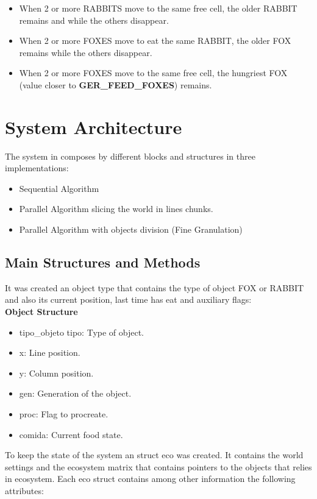 \documentclass[10pt,a4paper,final]{report}
\begin{document}
\begin{itemize}
\item When 2 or more RABBITS move to the same free cell, the older RABBIT remains and while the others disappear.
\item When 2 or more FOXES move to eat the same RABBIT, the older FOX remains while the others disappear.
\item When 2 or more FOXES move to the same free cell, the hungriest FOX (value closer to \textbf{GER\_FEED\_FOXES}) remains.
\end{itemize}


\section{System Architecture}
The system in composes by different blocks and structures in three implementations:
\begin{itemize}
\item Sequential Algorithm
\item Parallel Algorithm slicing the world in lines chunks.
\item Parallel Algorithm  with objects division (Fine Granulation)
\end{itemize}

\subsection{Main Structures and Methods}
It was created an object type that contains the type of object FOX or RABBIT and also its current position, last time has eat and auxiliary flags:\\

\textbf{Object Structure}
\begin{itemize}
\item tipo\_objeto tipo: Type of object.
\item x: Line position.
\item y: Column position.
\item gen: Generation of the object.
\item proc: Flag to procreate.
\item comida: Current food state.
\end{itemize}

\bigskip

To keep the state of the system an struct eco was created. It contains the world settings and the ecosystem matrix that contains pointers to the objects that relies in ecosystem. Each eco struct contains among other information the following attributes:\\
\end{document}
